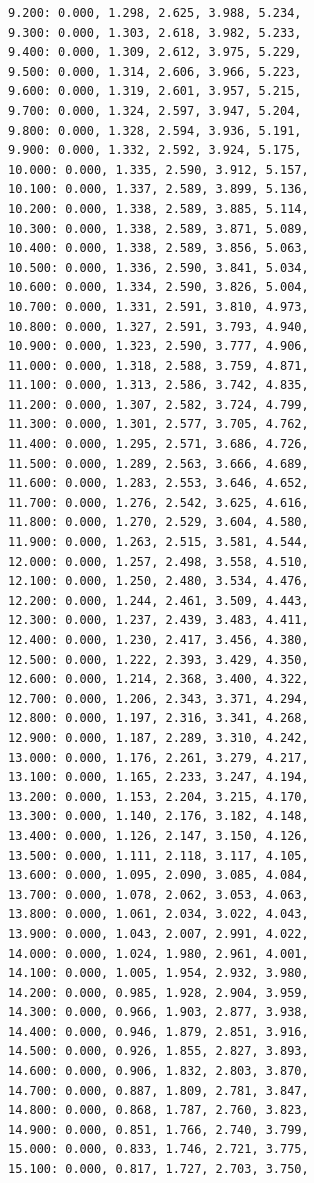 \documentclass[12pt, a4paper]{article}
\begin{document}
\begin{scriptsize}
\begin{ttfamily}
\begin{lstlisting}
9.200: 0.000, 1.298, 2.625, 3.988, 5.234, 
9.300: 0.000, 1.303, 2.618, 3.982, 5.233, 
9.400: 0.000, 1.309, 2.612, 3.975, 5.229, 
9.500: 0.000, 1.314, 2.606, 3.966, 5.223, 
9.600: 0.000, 1.319, 2.601, 3.957, 5.215, 
9.700: 0.000, 1.324, 2.597, 3.947, 5.204, 
9.800: 0.000, 1.328, 2.594, 3.936, 5.191, 
9.900: 0.000, 1.332, 2.592, 3.924, 5.175, 
10.000: 0.000, 1.335, 2.590, 3.912, 5.157, 
10.100: 0.000, 1.337, 2.589, 3.899, 5.136, 
10.200: 0.000, 1.338, 2.589, 3.885, 5.114, 
10.300: 0.000, 1.338, 2.589, 3.871, 5.089, 
10.400: 0.000, 1.338, 2.589, 3.856, 5.063, 
10.500: 0.000, 1.336, 2.590, 3.841, 5.034, 
10.600: 0.000, 1.334, 2.590, 3.826, 5.004, 
10.700: 0.000, 1.331, 2.591, 3.810, 4.973, 
10.800: 0.000, 1.327, 2.591, 3.793, 4.940, 
10.900: 0.000, 1.323, 2.590, 3.777, 4.906, 
11.000: 0.000, 1.318, 2.588, 3.759, 4.871, 
11.100: 0.000, 1.313, 2.586, 3.742, 4.835, 
11.200: 0.000, 1.307, 2.582, 3.724, 4.799, 
11.300: 0.000, 1.301, 2.577, 3.705, 4.762, 
11.400: 0.000, 1.295, 2.571, 3.686, 4.726, 
11.500: 0.000, 1.289, 2.563, 3.666, 4.689, 
11.600: 0.000, 1.283, 2.553, 3.646, 4.652, 
11.700: 0.000, 1.276, 2.542, 3.625, 4.616, 
11.800: 0.000, 1.270, 2.529, 3.604, 4.580, 
11.900: 0.000, 1.263, 2.515, 3.581, 4.544, 
12.000: 0.000, 1.257, 2.498, 3.558, 4.510, 
12.100: 0.000, 1.250, 2.480, 3.534, 4.476, 
12.200: 0.000, 1.244, 2.461, 3.509, 4.443, 
12.300: 0.000, 1.237, 2.439, 3.483, 4.411, 
12.400: 0.000, 1.230, 2.417, 3.456, 4.380, 
12.500: 0.000, 1.222, 2.393, 3.429, 4.350, 
12.600: 0.000, 1.214, 2.368, 3.400, 4.322, 
12.700: 0.000, 1.206, 2.343, 3.371, 4.294, 
12.800: 0.000, 1.197, 2.316, 3.341, 4.268, 
12.900: 0.000, 1.187, 2.289, 3.310, 4.242, 
13.000: 0.000, 1.176, 2.261, 3.279, 4.217, 
13.100: 0.000, 1.165, 2.233, 3.247, 4.194, 
13.200: 0.000, 1.153, 2.204, 3.215, 4.170, 
13.300: 0.000, 1.140, 2.176, 3.182, 4.148, 
13.400: 0.000, 1.126, 2.147, 3.150, 4.126, 
13.500: 0.000, 1.111, 2.118, 3.117, 4.105, 
13.600: 0.000, 1.095, 2.090, 3.085, 4.084, 
13.700: 0.000, 1.078, 2.062, 3.053, 4.063, 
13.800: 0.000, 1.061, 2.034, 3.022, 4.043, 
13.900: 0.000, 1.043, 2.007, 2.991, 4.022, 
14.000: 0.000, 1.024, 1.980, 2.961, 4.001, 
14.100: 0.000, 1.005, 1.954, 2.932, 3.980, 
14.200: 0.000, 0.985, 1.928, 2.904, 3.959, 
14.300: 0.000, 0.966, 1.903, 2.877, 3.938, 
14.400: 0.000, 0.946, 1.879, 2.851, 3.916, 
14.500: 0.000, 0.926, 1.855, 2.827, 3.893, 
14.600: 0.000, 0.906, 1.832, 2.803, 3.870, 
14.700: 0.000, 0.887, 1.809, 2.781, 3.847, 
14.800: 0.000, 0.868, 1.787, 2.760, 3.823, 
14.900: 0.000, 0.851, 1.766, 2.740, 3.799, 
15.000: 0.000, 0.833, 1.746, 2.721, 3.775, 
15.100: 0.000, 0.817, 1.727, 2.703, 3.750, 

\end{lstlisting}
\end{ttfamily}
\end{scriptsize}
\end{document}

